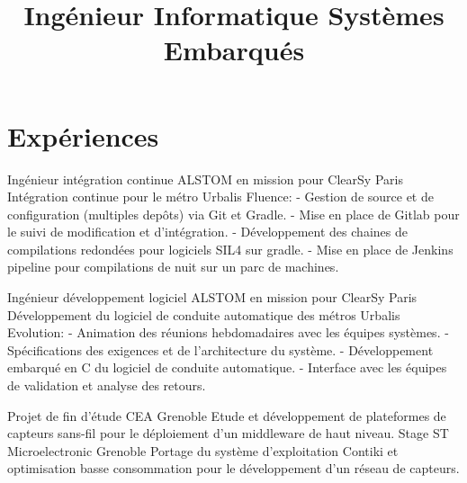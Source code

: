 \documentclass[10pt,a4paper]{moderncv}
\title{\large Ingénieur Informatique Systèmes Embarqués}
\begin{document}
\maketitle

\section{Expériences}

  {Ingénieur intégration continue}
  {ALSTOM en mission pour ClearSy}
  {}
  {Paris}
  {Intégration continue pour le métro Urbalis Fluence:\newline{}
  - Gestion de source et de configuration (multiples depôts) via Git et Gradle.\newline{}
  - Mise en place de Gitlab pour le suivi de modification et d'intégration.\newline{}
  - Développement des chaines de compilations redondées pour logiciels SIL4 sur gradle.\newline{}
  - Mise en place de Jenkins pipeline pour compilations de nuit sur un parc de machines.\newline{}}

  {Ingénieur développement logiciel}
  {ALSTOM en mission pour ClearSy}
  {}
  {Paris}
  {Développement du logiciel de conduite automatique des métros Urbalis Evolution:\newline{}
  - Animation des réunions hebdomadaires avec les équipes systèmes.\newline{}
  - Spécifications des exigences et de l'architecture du système.\newline{}
  - Développement embarqué en C du logiciel de conduite automatique.\newline{}
  - Interface avec les équipes de validation et analyse des retours.\newline{}}

  {Projet de fin d'étude}
  {CEA}
  {}
  {Grenoble}
  {Etude et développement de plateformes de capteurs sans-fil pour le déploiement d'un middleware de haut niveau.\newline{}}
  {Stage}
  {ST Microelectronic}
  {}
  {Grenoble}
  {Portage du système d'exploitation Contiki et optimisation basse consommation pour le développement d'un réseau de capteurs.\newline{}}
  
\end{document}
